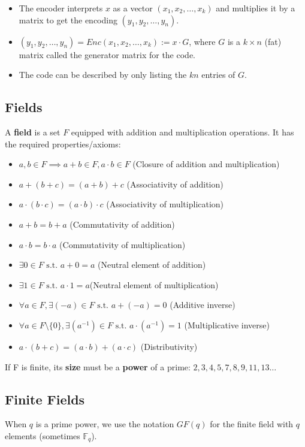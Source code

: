 \documentclass[11pt]{article}
\begin{document}
\begin{itemize}
  \item The encoder interprets $x$ as a vector $(x_1, x_2, \ldots, x_k)$ and multiplies it by a matrix to get the encoding $(y_1, y_2, \ldots, y_n)$.
  \item $(y_1, y_2, \ldots, y_n) = Enc(x_1, x_2, \ldots, x_k) := x \cdot G$, where $G$ is a $k \times n$ (fat) matrix called the generator matrix for the code.
  \item The code can be described by only listing the $kn$ entries of $G$.
\end{itemize}

\subsection{Fields}
A \textbf{field} is a set $F$ equipped with addition and multiplication operations.
It has the required properties/axioms:
\begin{itemize}
  \item $a, b \in F \implies a + b \in F, a \cdot b \in F$ (Closure of addition and multiplication)
  \item $a + (b + c) = (a + b) + c$ (Associativity of addition)
  \item $a \cdot (b \cdot c) = (a \cdot b) \cdot c$ (Associativity of multiplication)
  \item $a + b = b + a$ (Commutativity of addition)
  \item $a \cdot b = b \cdot a$ (Commutativity of multiplication)
  \item $\exists 0 \in F \text{ s.t. } a + 0 = a$ (Neutral element of addition)
  \item $\exists 1 \in F \text{ s.t. } a \cdot 1 = a$(Neutral element of multiplication)
  \item $\forall a \in F, \exists (-a) \in F \text{ s.t. } a + (-a) = 0$ (Additive inverse)
  \item $\forall a \in F \setminus \{ 0 \}, \exists (a^{-1}) \in F \text{ s.t. } a \cdot (a^{-1}) = 1$ (Multiplicative inverse)
  \item $a \cdot (b + c) = (a \cdot b) + (a \cdot c)$ (Distributivity)
\end{itemize}

If F is finite, its \textbf{size} must be a \textbf{power} of a prime: $2, 3, 4, 5, 7, 8, 9, 11, 13 \ldots$

\subsection{Finite Fields}
When $q$ is a prime power, we use the notation $GF(q)$ for the finite field with $q$ elements (sometimes $\mathbb{F}_q$).
\end{document}
